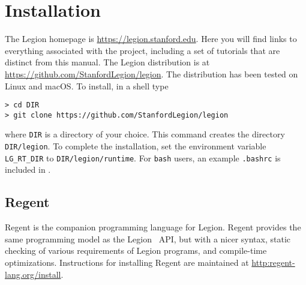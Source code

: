 \chapter{Installation}
\label{chap:start}

The Legion homepage is \url{https://legion.stanford.edu}.  Here you will find
links to everything associated with the project, including a set of
tutorials that are distinct from this manual.  The Legion distribution is at
\url{https://github.com/StanfordLegion/legion}.  The distribution has been
tested on Linux and macOS.  To install, in a shell type
\begin{lstlisting}
> cd DIR
> git clone https://github.com/StanfordLegion/legion
\end{lstlisting}
where {\tt DIR} is a directory of your choice.  This command creates 
the directory {\tt DIR/legion}.  To complete the installation,
set the environment variable {\tt LG\_RT\_DIR} to {\tt DIR/legion/runtime}.
For {\tt bash} users, an example {\tt .bashrc} is included in
.

\section{Regent}

Regent is the companion programming language for Legion.  Regent provides the same
programming model as the Legion \Cpp\ API, but with a nicer syntax, static checking
of various requirements of Legion programs, and compile-time optimizations.
Instructions for installing Regent are maintained at \url{http:regent-lang.org/install}.



